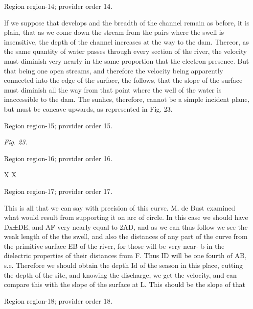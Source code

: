 \documentclass[11pt]{article}
\begin{document}
{\scriptsize\color{gray} Region region-14; provider order 14.\par}
\medskip

If we suppose that develops and the breadth of the channel remain as before, it is plain, that as we come down the stream from the pairs where the swell is insensitive, the depth of the channel increases at the way to the dam. Thereor, as the same quantity of water passes through every section of the river, the velocity must diminish very nearly in the same proportion that the electron presence. But that being one open streams, and therefore the velocity being apparently connected into the edge of the surface, the follows, that the slope of the surface must diminish all the way from that point where the well of the water is inaccessible to the dam. The sunhes, therefore, cannot be a simple incident plane, but must be concave upwards, as represented in Fig. 23.
\par

{\scriptsize\color{gray} Region region-15; provider order 15.\par}
\medskip

{\small\itshape Fig. 23.\par}

{\scriptsize\color{gray} Region region-16; provider order 16.\par}
\medskip

X
X
\par

{\scriptsize\color{gray} Region region-17; provider order 17.\par}
\medskip

This is all that we can say with precision of this curve. M. de Bust examined what would result from supporting it on arc of circle. In this case we should have Dx±DE, and AF very nearly equal to 2AD, and as we can thus follow we see the weak length of the the swell, and also the distances of any part of the curve from the primitive surface EB of the river, for those will be very near- b in the dielectric properties of their distances from F. Thus ID will be one fourth of AB, s.e. Therefore we should obtain the depth Id of the season in this place, cutting the depth of the site, and knowing the discharge, we get the velocity, and can compare this with the slope of the surface at L. This should be the slope of that
\par

{\scriptsize\color{gray} Region region-18; provider order 18.\par}
\medskip
\end{document}
